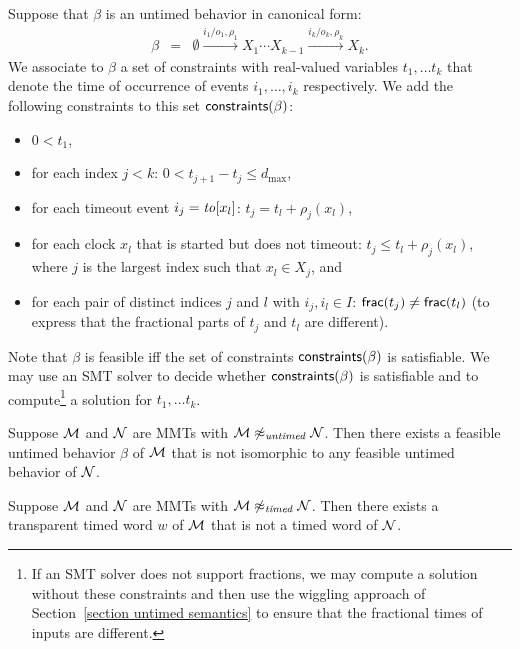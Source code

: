 Suppose that $\beta$ is an untimed behavior in canonical form:
\begin{eqnarray*}
\beta & = & \emptyset \xrightarrow{i_1/o_1, \rho_1} X_1  \cdots X_{k-1} \xrightarrow{i_k/o_k, \rho_k} X_k.
\end{eqnarray*}
We associate to $\beta$ a set of constraints with real-valued variables $t_1 ,\ldots t_k$ that denote the time of
occurrence of events $i_1 ,\ldots, i_k$ respectively. We add the following constraints to this set $\mathsf{constraints}({\beta})$:
\begin{itemize}
\item
$0 < t_1$,
\item
for each index $j < k$:  $0 <  t_{j+1} - t_j \leq d_{\max}$,
\item
for each timeout event $i_j = \mathit{to}[x_l]$: $t_j = t_l + \rho_j(x_l)$,
\item
for each clock $x_l$ that is started but does not timeout: $t_j \leq t_l + \rho_j(x_l)$,
where $j$ is the largest index such that $x_l \in X_j$, and
\item
for each pair of distinct indices $j$ and $l$ with $i_j, i_l \in I$: $\mathsf{frac}({t_j}) \neq \mathsf{frac}({t_l})$ 
(to express that the fractional parts of $t_j$ and $t_l$ are different).
\end{itemize}
Note that $\beta$ is feasible iff the set of constraints $\mathsf{constraints}({\beta})$ is satisfiable.
We may use an SMT solver to decide whether $\mathsf{constraints}({\beta})$ is satisfiable and to compute\footnote{If an SMT solver
does not support fractions, we may compute a solution without these constraints and then use the wiggling approach
of Section~\ref{section untimed semantics} to ensure that the fractional times of inputs are different.} a solution for
$t_1 ,\ldots t_k$.


\begin{lemma}
\label{not untimed}
Suppose ${\mathcal M}$ and ${\mathcal N}$ are MMTs with ${\mathcal M} \not\approx_{\mathit{untimed}} {\mathcal N}$.
Then there exists a feasible untimed behavior $\beta$ of ${\mathcal M}$ that is not isomorphic to any feasible untimed
behavior of ${\mathcal N}$.
\end{lemma}

\begin{lemma}
\label{not timed}
Suppose ${\mathcal M}$ and ${\mathcal N}$ are MMTs with ${\mathcal M} \not\approx_{\mathit{timed}} {\mathcal N}$.
Then there exists a transparent timed word $w$ of ${\mathcal M}$ that is not a timed word of ${\mathcal N}$.
\end{lemma}

\fi
